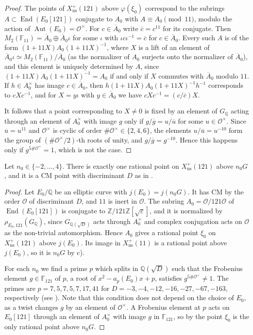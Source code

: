 \documentclass[11pt,reqno]{amsart}
\DeclareMathOperator{\End}{End}
\DeclareMathOperator{\Aut}{Aut}
\newcommand{\Q}{\mathbb{Q}}
\newcommand{\Z}{\mathbb{Z}}
\newcommand{\F}{\mathbb{F}}
\newcommand{\OO}{\mathcal{O}}
\newcommand{\ns}{\mathrm{ns}}
\newcommand{\Xns}[1]{X_{\ns}^+(#1)}
\newcommand{\repocommit}{c12c8c3705ed0b6b52254df69bd5ffe84542d568}
\newcommand{\githubbare}[1]{\href{https://github.com/F-Najman/Xns-121-/blob/\repocommit/#1}{\path{#1}}}
\theoremstyle{definition}
\numberwithin{equation}{section}
\begin{document}
\begin{proof}
The points of $\Xns{121}$ above $\varphi(\xi_0)$ correspond to the subrings $A\subset \End(E_0[121])$ conjugate to $A_0$ with $A\equiv A_0 \pmod{11}$, modulo the action of $\Aut(E_0)=\OO^\times$. For $c\in\overline A_0$ write $\overline c=c^{11}$ for its conjugate. Then $M_2(\F_{11})=\overline A_0\oplus \overline A_0\iota$ for some $\iota$ with $\iota c\iota^{-1}=\overline c$ for $c\in \overline A_0$. Every such $A$ is of the form $(1+11X)A_0(1+11X)^{-1}$, where $X$ is a lift of an element of $\overline A_0\iota\simeq M_2(\F_{11})/\overline A_0$ (as the normalizer of $A_0$ surjects onto the normalizer of $\overline A_0$), and this element is uniquely determined by $A$, since $(1+11X)A_0(1+11X)^{-1}=A_0$ if and only if $X$ commutes with $\overline A_0$ modulo $11$. If $h\in A_0^\times$ has image $c\in\overline A_0$, then $h(1+11X)A_0(1+11X)^{-1}h^{-1}$ corresponds to $cXc^{-1}$, and for $X=y\iota$ with $y\in \overline A_0$ we have $cXc^{-1}=(c/\overline c)X$.

It follows that a point corresponding to $X\neq 0$ is fixed by an element of $G_\Q$ acting through an element of $A_0^\times$ with image $g$ only if $g/\overline g=u/\overline u$ for some $u\in \OO^\times$. Since $\overline u=u^{11}$ and $\OO^\times$ is cyclic of order $\#\OO^\times\in\{2,4,6\}$, the elements $u/\overline u=u^{-10}$ form the group of $(\#\OO^\times/2)$-th roots of unity, and $g/\overline g=g^{-10}$. Hence this happens only if $g^{5\#\OO^\times}=1$, which is not the case.
\end{proof}

\begin{lemma}\label{lem:cm_lifts}
Let $n_0\in\{-2,\ldots,4\}$. There is exactly one rational point on $\Xns{121}$ above $n_0G$, and it is a CM point with discriminant $D$ as in .
\end{lemma}

\begin{proof}
Let $E_0/\Q$ be an elliptic curve with $j(E_0)=j(n_0G)$. It has CM by the order $\OO$ of discriminant $D$, and $11$ is inert in $\OO$. The subring $A_0=\OO/121\OO$ of $\End(E_0[121])$ is conjugate to $\Z/121\Z[\sqrt\varepsilon]$, and it is normalized by $\rho_{E_0,121}(G_\Q)$, since $G_{\Q(\sqrt D)}$ acts through $A_0^\times$ and complex conjugation acts on $\OO$ as the non-trivial automorphism. Hence $A_0$ gives a rational point $\xi_0$ on $\Xns{121}$ above $j(E_0)$. Its image in $\Xns{11}$ is a rational point above $j(E_0)$, so it is $n_0G$ by  c).

For each $n_0$ we find a prime $p$ which splits in $\Q(\sqrt D)$ such that the Frobenius element $g\in \F_{121}$ of $p$, a root of $x^2-a_p(E_0)x+p$, satisfies $g^{5\#\OO^\times}\neq 1$. The primes are $p=7,5,7,5,7,17,41$ for $D=-3,-4,-12,-16,-27,-67,-163$, respectively (see \githubbare{code/cm_lifts.m}). Note that this condition does not depend on the choice of $E_0$, as a twist changes $g$ by an element of $\OO^\times$. A Frobenius element at $p$ acts on $E_0[121]$ through an element of $A_0^\times$ with image $g$ in $\F_{121}$, so by  the point $\xi_0$ is the only rational point above $n_0G$.
\end{proof}
\end{document}
